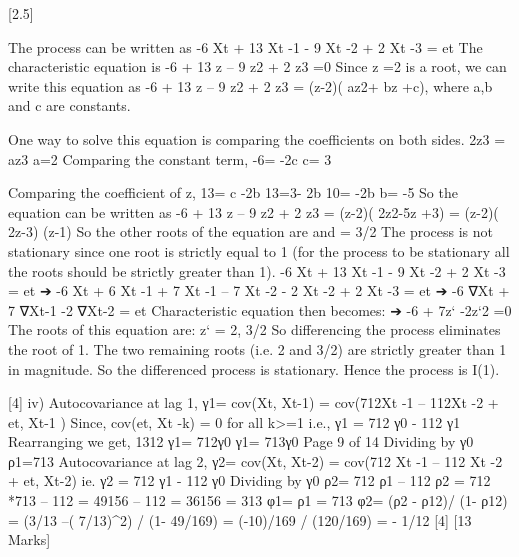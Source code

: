 \documentclass[a4paper,12pt]{article}
\begin{document}
[2.5]
\item  
The process can be written as
-6 Xt + 13 Xt -1 - 9 Xt -2 + 2 Xt -3 = et
The characteristic equation is
-6 + 13 z – 9 z2 + 2 z3 =0
Since z =2 is a root, we can write this equation as
-6 + 13 z – 9 z2 + 2 z3 = (z-2)( az2+ bz +c), where a,b and c are constants.

One way to solve this equation is comparing the coefficients on both sides.
2z3 = az3
a=2
Comparing the constant term,
-6= -2c
c= 3

Comparing the coefficient of z,
13= c -2b
13=3- 2b
10= -2b
b= -5 
So the equation can be written as
-6 + 13 z – 9 z2 + 2 z3 = (z-2)( 2z2-5z +3)
= (z-2)( 2z-3) (z-1)
So the other roots of the equation are  and \lambda = 3/2
The process is not stationary since one root is strictly equal to 1 (for the process to be stationary all the roots should be strictly greater than 1). 
-6 Xt + 13 Xt -1 - 9 Xt -2 + 2 Xt -3 = et
➔ -6 Xt + 6 Xt -1 + 7 Xt -1 – 7 Xt -2 - 2 Xt -2 + 2 Xt -3 = et
➔ -6 ∇Xt + 7 ∇Xt-1 -2 ∇Xt-2 = et
Characteristic equation then becomes:
➔ -6 + 7z` -2z`2 =0
The roots of this equation are: z` = 2, 3/2
So differencing the process eliminates the root of 1. The two remaining roots (i.e. 2 and 3/2) are strictly greater than 1 in magnitude.
So the differenced process is stationary. Hence the process is I(1).

[4]
iv)
Autocovariance at lag 1, γ1= cov(Xt, Xt-1)
= cov(712Xt -1 – 112Xt -2 + et, Xt-1 )
Since, cov(et, Xt -k) = 0 for all k>=1
i.e., γ1 = 712 γ0 - 112 γ1
Rearranging we get,
1312 γ1= 712γ0
γ1= 713γ0
Page 9 of 14
Dividing by γ0
ρ1=713
Autocovariance at lag 2, γ2= cov(Xt, Xt-2)
= cov(712 Xt -1 – 112 Xt -2 + et, Xt-2)
ie. γ2 = 712 γ1 - 112 γ0
Dividing by γ0
ρ2= 712 ρ1 – 112
ρ2 = 712 *713 – 112 = 49156 – 112 = 36156 = 313
φ1= ρ1 = 713
φ2= (ρ2 - ρ12)/ (1- ρ12)
= (3/13 –( 7/13)^2) / (1- 49/169)
= (-10)/169 / (120/169)
= - 1/12
[4]
[13 Marks]
\end{document}
